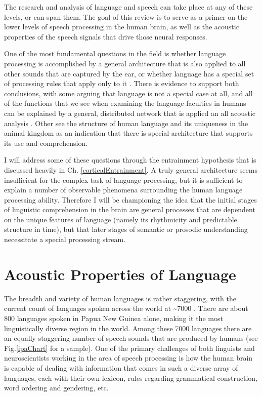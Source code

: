 \documentclass[titlepage]{article}
\begin{document}
  The research and analysis of language and speech can take place at any of these
  levels, or can span them. The goal of this review is to serve as a primer
  on the lower levels of speech processing in the human brain, as well as the
  acoustic properties of the speech signals that drive those neural responses.

  One of the most fundamental questions in the field is whether language processing
  is accomplished by a general architecture that is also applied to all other sounds
  that are captured by the ear, or whether language has a special set of processing
  rules that apply only to it \cite{Uddin2018}. There is evidence to support both
  conclusions, with some arguing that language is not a special case at all, and all
  of the functions that we see when examining the language faculties in humans can be
  explained by a general, distributed network that is applied an all acoustic analysis
  \cite{Dick2001}. Other see the structure of human language and its uniqueness in the
  animal kingdom \cite{Chomsky1986,Fodor1983} as an indication that there is special
  architecture that supports its use and comprehension.

  I will address some of these questions
  through the entrainment hypothesis that is discussed heavily in Ch. \ref{corticalEntrainment}.
  A truly general architecture seems insufficient for the complex task of language processing,
  but it is sufficient to explain a number of observable phenomena surrounding the human
  language processing ability. Therefore I will be championing the idea that the initial stages
  of linguistic comprehension in the brain are general processes that are dependent on the unique
  features of language (namely its rhythmicity and predictable structure in time), but that
  later stages of semantic or prosodic understanding necessitate a special processing stream.

\section{Acoustic Properties of Language} \label{acoustics}

  The breadth and variety of human languages is rather staggering, with
  the current count of languages spoken across the world at \textasciitilde 7000 \cite{Simons2017}.
  There are about 800 languages spoken in Papua New Guinea alone, making it the
  most linguistically diverse region in the world. Among these 7000 languages
  there are an equally staggering number of speech sounds that are produced by humans
  (see Fig.\ref{ipaChart} for a sample). One of the primary challenges of both
  linguists and neuroscientists working in the area of speech processing is
  how the human brain is capable of dealing with information that comes in such a diverse
  array of languages, each with their own lexicon, rules regarding grammatical construction,
  word ordering and gendering, etc.
\end{document}
